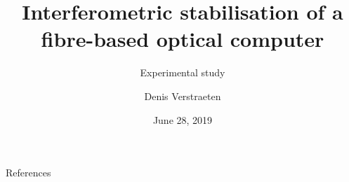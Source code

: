 




\title[Master Thesis]{Interferometric stabilisation of a fibre-based optical computer}
\subtitle{Experimental study}
\author{Denis Verstraeten}
\date{June 28, 2019}



	\begin{frame}[plain]
		\titlepage
	\end{frame}
	
	
	
	
	
	
	

	


	


	

	
	\begin{frame}[t, allowframebreaks]{References}
		\printbibliography[heading=none]
	\end{frame}
	
